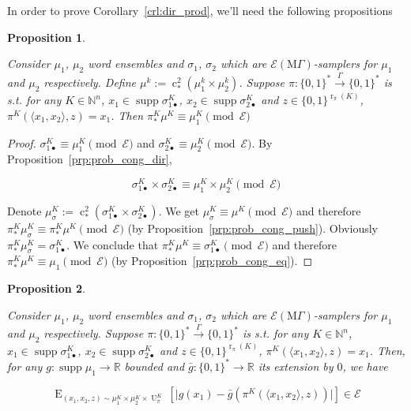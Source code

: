 \documentclass{article}
\numberwithin{equation}{section}
\theoremstyle{definition}
\theoremstyle{plain}
\newtheorem{proposition}{Proposition}[section]
\newcommand{\Bool}{\{0,1\}}
\newcommand{\Words}{{\Bool^*}}
\DeclareMathOperator{\Supp}{supp}
\DeclareMathOperator{\E}{E}
\DeclareMathOperator{\R}{r}
\DeclareMathOperator{\Un}{U}
\DeclareMathOperator{\En}{c}
\newcommand{\Nats}{\mathbb{N}}
\newcommand{\Reals}{\mathbb{R}}
\newcommand{\Abs}[1]{\lvert #1 \rvert}
\newcommand{\Chev}[1]{\langle #1 \rangle}
\newcommand{\MGrow}{\mathrm{M}\Gamma}
\newcommand{\Fall}{\mathcal{E}}
\newcommand{\EMG}{\Fall(\MGrow)}
\newcommand{\Scheme}{\xrightarrow{\Gamma}}
\begin{document}
In order to prove Corollary~\ref{crl:dir_prod}, we'll need the following propositions

\begin{samepage}
\begin{proposition}
\label{prp:thm__mult__cond1}

Consider $\mu_1$, $\mu_2$ word ensembles and $\sigma_1$, $\sigma_2$ which are $\EMG$-samplers for $\mu_1$ and $\mu_2$ respectively. Define ${\mu^k:=\En_*^2(\mu_1^k \times \mu_2^k)}$. Suppose $\pi: \Words \Scheme \Words$ is s.t. for any $K \in \Nats^n$, $x_1 \in \Supp \sigma_{1\bullet}^{K}$, ${x_2 \in \Supp \sigma_{2\bullet}^{K}}$ and $z \in \Bool^{\R_\pi(K)}$, $\pi^{K}(\Chev{x_1,x_2},z)=x_1$. Then $\pi_*^K\mu^{K} \equiv \mu_1^{K} \pmod \Fall$

\end{proposition}
\end{samepage}

\begin{proof}

$\sigma_{1\bullet}^{K} \equiv \mu_1^{K} \pmod \Fall$ and $\sigma_{2\bullet}^{K} \equiv \mu_2^{K} \pmod \Fall$.  By Proposition~\ref{prp:prob_cong_dir},

\[\sigma_{1\bullet}^{K} \times \sigma_{2\bullet}^{K} \equiv \mu_1^{K} \times \mu_2^{K} \pmod \Fall\]

Denote $\mu_\sigma^{K}:=\En_*^2(\sigma_{1\bullet}^{K} \times \sigma_{2\bullet}^{K})$. We get ${\mu_\sigma^{K} \equiv \mu^{K} \pmod \Fall}$ and therefore ${\pi_*^K\mu_\sigma^{K} \equiv \pi_*^K\mu^{K} \pmod \Fall}$ (by Proposition~\ref{prp:prob_cong_push}). Obviously $\pi_*^K\mu_\sigma^{K}=\sigma_{1\bullet}^{K}$. We conclude that ${\pi_*^K\mu^{K} \equiv \sigma_{1\bullet}^{K} \pmod \Fall}$ and therefore ${\pi_*^K\mu^{K} \equiv \mu_1 \pmod \Fall}$ (by Proposition~\ref{prp:prob_cong_eq}).
\end{proof}

\begin{samepage}
\begin{proposition}
\label{prp:thm__mult__cond2}

Consider $\mu_1$, $\mu_2$ word ensembles and $\sigma_1$, $\sigma_2$ which are $\EMG$-samplers for $\mu_1$ and $\mu_2$ respectively. Suppose $\pi: \Words \Scheme \Words$ is s.t. for any $K \in \Nats^n$, $x_1 \in \Supp \sigma_{1\bullet}^{K}$, ${x_2 \in \Supp \sigma_{2\bullet}^{K}}$ and $z \in \Bool^{\R_\pi(K)}$, $\pi^{K}(\Chev{x_1,x_2},z)=x_1$. Then, for any $g: \Supp \mu_1 \rightarrow \Reals$ bounded and ${\bar{g}: \Words \rightarrow \Reals}$ its extension by ${0}$, we have 

$$\E_{(x_1,x_2,z) \sim\mu_1^{K} \times \mu_2^{K} \times \Un_\pi^{K}}[\Abs{g(x_1)-\bar{g}(\pi^{K}(\Chev{x_1,x_2},z))}] \in \Fall$$

\end{proposition}
\end{samepage}
\end{document}
